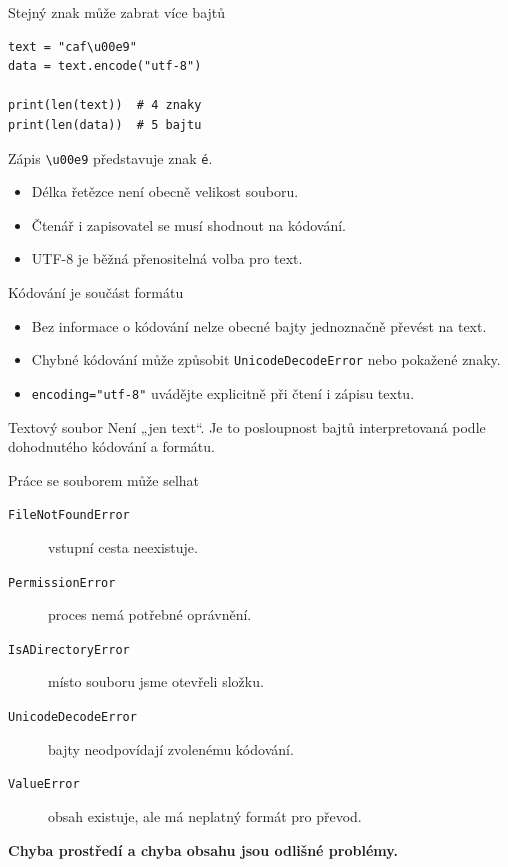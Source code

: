 \documentclass[aspectratio=169]{beamer}
\newcommand{\term}[1]{\textcolor{CodeBlue}{\textbf{#1}}}
\begin{document}
\begin{frame}[fragile]{Stejný znak může zabrat více bajtů}
\begin{lstlisting}[style=python]
text = "caf\u00e9"
data = text.encode("utf-8")

print(len(text))  # 4 znaky
print(len(data))  # 5 bajtu
\end{lstlisting}
  Zápis \texttt{\textbackslash u00e9} představuje znak \texttt{é}.
  \begin{itemize}
    \item Délka řetězce není obecně velikost souboru.
    \item Čtenář i zapisovatel se musí shodnout na kódování.
    \item UTF-8 je běžná přenositelná volba pro text.
  \end{itemize}
\end{frame}

\begin{frame}{Kódování je součást formátu}
  \begin{itemize}
    \item Bez informace o kódování nelze obecné bajty jednoznačně převést na text.
    \item Chybné kódování může způsobit \texttt{UnicodeDecodeError} nebo pokažené znaky.
    \item \texttt{encoding="utf-8"} uvádějte explicitně při čtení i zápisu textu.
  \end{itemize}
  \begin{block}{Textový soubor}
    Není „jen text“. Je to posloupnost bajtů interpretovaná podle dohodnutého kódování a formátu.
  \end{block}
\end{frame}

\begin{frame}{Práce se souborem může selhat}
  \begin{description}
    \item[\texttt{FileNotFoundError}] vstupní cesta neexistuje.
    \item[\texttt{PermissionError}] proces nemá potřebné oprávnění.
    \item[\texttt{IsADirectoryError}] místo souboru jsme otevřeli složku.
    \item[\texttt{UnicodeDecodeError}] bajty neodpovídají zvolenému kódování.
    \item[\texttt{ValueError}] obsah existuje, ale má neplatný formát pro převod.
  \end{description}
  \term{Chyba prostředí a chyba obsahu jsou odlišné problémy.}
\end{frame}
\end{document}
